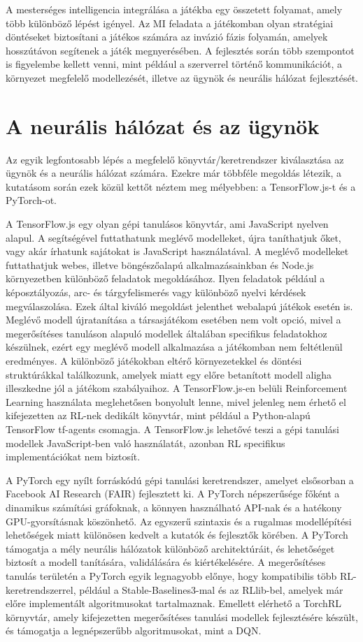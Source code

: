 \documentclass[
]{thesis-ekf}
\theoremstyle{definition}
\theoremstyle{remark}
\begin{document}
	A mesterséges intelligencia integrálása a játékba egy összetett folyamat, amely több különböző lépést igényel. Az MI feladata a játékomban olyan stratégiai döntéseket biztosítani a játékos számára az invázió fázis folyamán, amelyek hosszútávon segítenek a játék megnyerésében. A fejlesztés során több szempontot is figyelembe kellett venni, mint például a szerverrel történő kommunikációt, a környezet megfelelő modellezését, illetve az ügynök és neurális hálózat fejlesztését.
	
	\section{A neurális hálózat és az ügynök}
	
	Az egyik legfontosabb lépés a megfelelő könyvtár/keretrendszer kiválasztása az ügynök és a neurális hálózat számára. Ezekre már többféle megoldás létezik, a kutatásom során ezek közül kettőt néztem meg mélyebben: a TensorFlow.js-t és a PyTorch-ot.
	
	A TensorFlow.js egy olyan gépi tanulásos könyvtár, ami JavaScript nyelven alapul. A segítségével futtathatunk meglévő modelleket, újra taníthatjuk őket, vagy akár írhatunk sajátokat is JavaScript használatával. A meglévő modelleket futtathatjuk webes, illetve böngészőalapú alkalmazásainkban és Node.js környezetben különböző feladatok megoldásához. Ilyen feladatok például a képosztályozás, arc- és tárgyfelismerés vagy különböző nyelvi kérdések megválaszolása. Ezek által kiváló megoldást jelenthet webalapú játékok esetén is. Meglévő modell újratanítása a társasjátékom esetében nem volt opció, mivel a megerősítéses tanuláson alapuló modellek általában specifikus feladatokhoz készülnek, ezért egy meglévő modell alkalmazása a játékomban nem feltétlenül eredményes. A különböző játékokban eltérő környezetekkel és döntési struktúrákkal találkozunk, amelyek miatt egy előre betanított modell aligha illeszkedne jól a játékom szabályaihoz. A TensorFlow.js-en belüli Reinforcement Learning használata meglehetősen bonyolult lenne, mivel jelenleg nem érhető el kifejezetten az RL-nek dedikált könyvtár, mint például a Python-alapú TensorFlow tf-agents csomagja. A TensorFlow.js lehetővé teszi a gépi tanulási modellek JavaScript-ben való használatát, azonban RL specifikus implementációkat nem biztosít. \cite{TFJS}
	
	A PyTorch egy nyílt forráskódú gépi tanulási keretrendszer, amelyet elsősorban a Facebook AI Research (FAIR) fejlesztett ki. A PyTorch népszerűsége főként a dinamikus számítási gráfoknak, a könnyen használható API-nak és a hatékony GPU-gyorsításnak köszönhető. Az egyszerű szintaxis és a rugalmas modellépítési lehetőségek miatt különösen kedvelt a kutatók és fejlesztők körében. A PyTorch támogatja a mély neurális hálózatok különböző architektúráit, és lehetőséget biztosít a modell tanítására, validálására és kiértékelésére. A megerősítéses tanulás területén a PyTorch egyik legnagyobb előnye, hogy kompatibilis több RL-keretrendszerrel, például a Stable-Baselines3-mal és az RLlib-bel, amelyek már előre implementált algoritmusokat tartalmaznak. Emellett elérhető a TorchRL környvtár, amely kifejezetten megerősítéses tanulási modellek fejlesztésére készült, és támogatja a legnépszerűbb algoritmusokat, mint a DQN. \cite{PYTCH}
	
\end{document}
